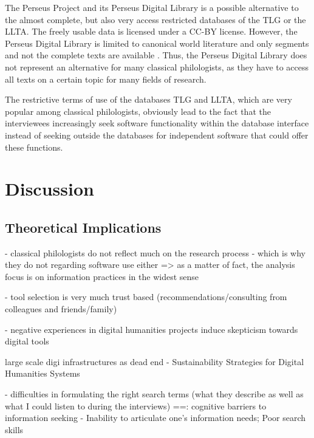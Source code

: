 \documentclass[12pt, a4paper, titlepage, oneside, abstract=true, toc=listof, toc=bibliography]{scrreprt}
\begin{document}
{%
The Perseus Project and its Perseus Digital Library is a possible alternative to the almost complete, but also very access restricted databases of the TLG or the LLTA. The freely usable data is licensed under a CC-BY license. However, the Perseus Digital Library is limited to canonical world literature and only segments and not the complete texts are available \citep{Lang2018}. Thus, the Perseus Digital Library does not represent an alternative for many classical philologists, as they have to access all texts on a certain topic for many fields of research.

The restrictive terms of use of the databases TLG and LLTA, which are very popular among classical philologists, obviously lead to the fact that the interviewees increasingly seek software functionality within the database interface instead of seeking outside the databases for independent software that could offer these functions.

\chapter{Discussion}
\label{sec:discussion}
\section{Theoretical Implications}
- classical philologists do not reflect much on the research process - which is why they do not regarding software use either => as a matter of fact, the analysis focus is on information practices in the widest sense


- tool selection is very much trust based (recommendations/consulting from colleagues and friends/family)

- negative experiences in digital humanities projects induce skepticism towards digital tools

\cite{Zundert2012} large scale digi infrastructures as dead end
\cite{Neuefeind2020} - Sustainability Strategies for Digital Humanities Systems

- difficulties in formulating the right search terms (what they describe as well as what I could listen to during the interviews)
==\cite{Savolainen2015a}: cognitive barriers to information seeking - Inability to articulate one’s information needs; Poor search skills

}
\end{document}
